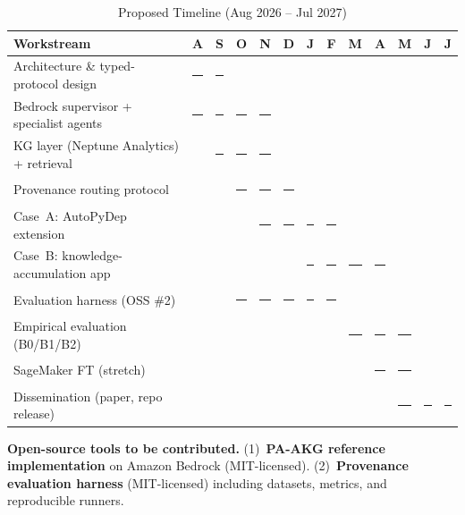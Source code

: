 \documentclass[11pt]{proposalnsf}
\newcommand{\gantt}{\rule[0.5pt]{12pt}{6pt}}
\begin{document}
\begin{table}[!ht]
\centering
\caption{Proposed Timeline (Aug 2026 -- Jul 2027)}
\label{tab:gantt}
\small
\begin{tabular}{lcccccccccccc}
\toprule
\textbf{Workstream} & A & S & O & N & D & J & F & M & A & M & J & J \\
\midrule
Architecture \& typed-protocol design                & \gantt & \gantt &        &        &        &        &        &        &        &        &        &        \\
Bedrock supervisor + specialist agents               & \gantt & \gantt & \gantt & \gantt &        &        &        &        &        &        &        &        \\
KG layer (Neptune Analytics) + retrieval             &        & \gantt & \gantt & \gantt &        &        &        &        &        &        &        &        \\
Provenance routing protocol                          &        &        & \gantt & \gantt & \gantt &        &        &        &        &        &        &        \\
Case~A: AutoPyDep extension                          &        &        &        & \gantt & \gantt & \gantt & \gantt &        &        &        &        &        \\
Case~B: knowledge-accumulation app                   &        &        &        &        &        & \gantt & \gantt & \gantt & \gantt &        &        &        \\
Evaluation harness (OSS \#2)                         &        &        & \gantt & \gantt & \gantt & \gantt & \gantt &        &        &        &        &        \\
Empirical evaluation (B0/B1/B2)                      &        &        &        &        &        &        &        & \gantt & \gantt & \gantt &        &        \\
SageMaker FT (stretch)                               &        &        &        &        &        &        &        &        & \gantt & \gantt &        &        \\
Dissemination (paper, repo release)                  &        &        &        &        &        &        &        &        &        & \gantt & \gantt & \gantt \\
\bottomrule
\end{tabular}
\end{table}

\textbf{Open-source tools to be contributed.} (1)~\textbf{PA-AKG reference implementation} on Amazon Bedrock (MIT-licensed). (2)~\textbf{Provenance evaluation harness} (MIT-licensed) including datasets, metrics, and reproducible runners.
\end{document}
